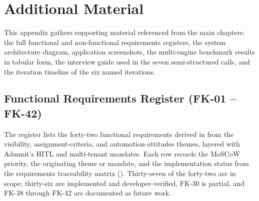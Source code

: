 \chapter{Additional Material}
\label{chap:appendix}

This appendix gathers supporting material referenced from the main chapters: the full functional and non-functional requirements registers, the system architecture diagram, application screenshots, the multi-engine benchmark results in tabular form, the interview guide used in the seven semi-structured calls, and the iteration timeline of the six named iterations.


\section{Functional Requirements Register (FK-01 -- FK-42)}
\label{app:requirements-functional}

The register lists the forty-two functional requirements derived in  from the visibility, assignment-criteria, and automation-attitudes themes, layered with Admmit's HITL and multi-tenant mandates. Each row records the MoSCoW priority, the originating theme or mandate, and the implementation status from the requirements traceability matrix (). Thirty-seven of the forty-two are in scope; thirty-six are implemented and developer-verified, FK-30 is partial, and FK-38 through FK-42 are documented as future work.

